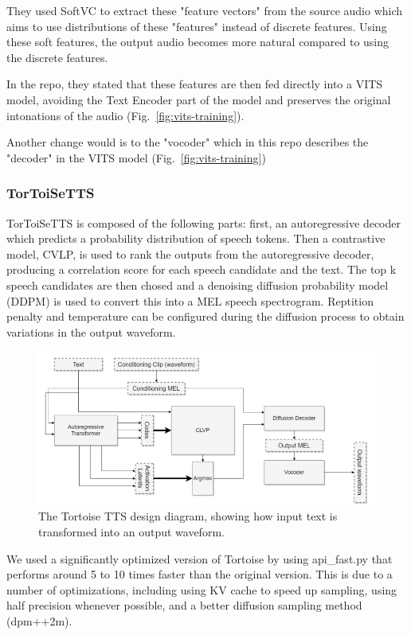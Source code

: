 \documentclass[conference]{IEEEtran}
\begin{document}
They used SoftVC \cite{softvc} to extract these "feature vectors" from the source audio which aims to use
distributions of these "features" instead of discrete features. Using these soft features, the output audio becomes 
more natural compared to using the discrete features.

In the repo, they stated that these features are then fed directly into a VITS model, avoiding the Text Encoder
part of the model and preserves the original intonations of the audio (Fig.~\ref{fig:vits-training}).

Another change would is to the "vocoder" which in this repo describes the "decoder" in the VITS model (Fig.~\ref{fig:vits-training})

\subsubsection{TorToiSeTTS}

TorToiSeTTS \cite{ttts} is composed of the following parts: first, an autoregressive decoder which predicts a probability distribution of speech tokens. Then a contrastive model, CVLP, is used to rank the outputs from the autoregressive decoder, producing a correlation score for each speech candidate and the text. The top k speech candidates are then chosed and a denoising diffusion probability model (DDPM) is used to convert this into a MEL speech spectrogram. Reptition penalty and temperature can be configured during the diffusion process to obtain variations in the output waveform.

\begin{figure}[htb]
    \centering
    \includegraphics[scale=0.65]{tortoisefigure2.png}
    \caption{The Tortoise TTS design diagram, showing how input text is transformed into an output waveform.}
    \label{fig:tortoise}
\end{figure}

We used a significantly optimized version of Tortoise by using api\_fast.py \cite{fasttortoise} that performs around 5 to 10 times faster than the original version. This is due to a number of optimizations, including using KV cache to speed up sampling, using half precision whenever possible, and a better diffusion sampling method (dpm++2m).
\end{document}
